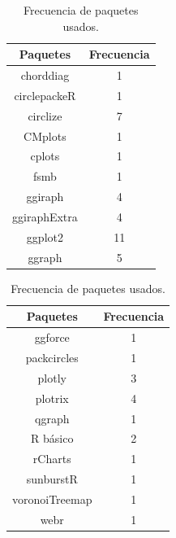\documentclass{article}\usepackage[]{graphicx}\usepackage[]{color}
\begin{document}
\begin{table}[h!]
\centering
\begin{tabular}{|c|c|} 
\hline
Paquetes & Frecuencia \\
\hline
 chorddiag & 1 \\
\hline
circlepackeR & 1\\
\hline
circlize & 7\\
\hline
CMplots & 1 \\
\hline
cplots & 1 \\
\hline
fsmb & 1 \\
\hline
ggiraph & 4 \\
\hline
ggiraphExtra & 4 \\
\hline
ggplot2 & 11 \\
\hline
ggraph & 5 \\
\hline
\end{tabular}
\begin{tabular}{|c|c|} 
\hline
Paquetes & Frecuencia \\
\hline
ggforce & 1 \\
\hline
packcircles & 1 \\
\hline
plotly & 3 \\
\hline
plotrix & 4 \\
\hline
qgraph & 1 \\
\hline
R b\'asico & 2 \\
\hline
rCharts & 1 \\
\hline
sunburstR & 1 \\
\hline
voronoiTreemap & 1 \\
\hline
webr & 1 \\
\hline
\end{tabular}
\caption{Frecuencia de paquetes usados.}
\label{table:tabla2}
\end{table}
\end{document}

